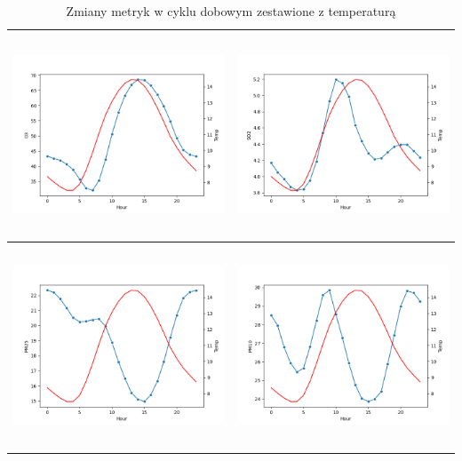 \documentclass[18pt, letterpaper]{article}
\begin{document}
\begin{table}[H]
\begin{tabular}{|c|c|}
\includegraphics[width=80mm,height=60mm]{visualisations/cycles/hourly_O3_temp.png}  & \includegraphics[width=80mm,height=60mm]{visualisations/cycles/hourly_SO2_temp.png} \\ \hline
\includegraphics[width=80mm,height=60mm]{visualisations/cycles/hourly_PM25_temp.png}  & \includegraphics[width=80mm,height=60mm]{visualisations/cycles/hourly_PM10_temp.png} \\ \hline
\end{tabular}
\caption{Zmiany metryk w cyklu dobowym zestawione z temperaturą}
\label{table:daily_temp}
\end{table}
\end{document}
